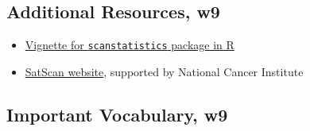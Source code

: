 \documentclass[
]{book}
\newcommand{\passthrough}[1]{#1}
\providecommand{\tightlist}{%
  \setlength{\itemsep}{0pt}\setlength{\parskip}{0pt}}
\begin{document}
\hypertarget{additional-resources-w9}{%
\subsection{Additional Resources, w9}\label{additional-resources-w9}}

\begin{itemize}
\tightlist
\item
  \href{https://github.com/BenjaK/scanstatistics}{Vignette for \passthrough{\lstinline!scanstatistics!} package in R}
\item
  \href{https://www.satscan.org/}{SatScan website}, supported by National Cancer Institute
\end{itemize}

\hypertarget{important-vocabulary-w9}{%
\subsection{Important Vocabulary, w9}\label{important-vocabulary-w9}}

 
  \providecommand{\huxb}[2]{\arrayrulecolor[RGB]{#1}\global\arrayrulewidth=#2pt}
  \providecommand{\huxvb}[2]{\color[RGB]{#1}\vrule width #2pt}
  \providecommand{\huxtpad}[1]{\rule{0pt}{#1}}
  \providecommand{\huxbpad}[1]{\rule[-#1]{0pt}{#1}}
\end{document}
